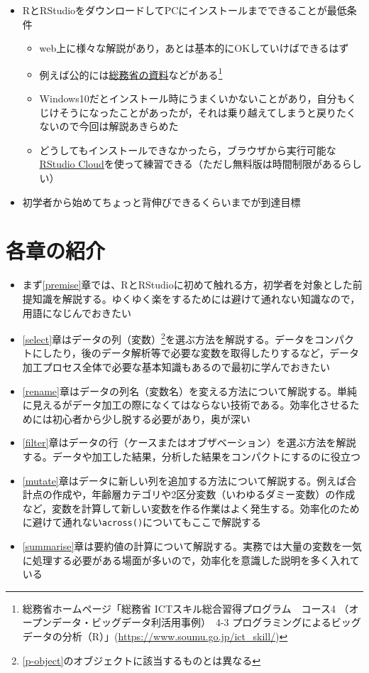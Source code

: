 \documentclass[
  xelatex,ja=standard, b5paper]{bxjsbook}
\providecommand{\tightlist}{%
  \setlength{\itemsep}{0pt}\setlength{\parskip}{0pt}}
\begin{document}
\begin{itemize}
\tightlist
\item
  RとRStudioをダウンロードしてPCにインストールまでできることが最低条件

  \begin{itemize}
  \tightlist
  \item
    web上に様々な解説があり，あとは基本的にOKしていけばできるはず
  \item
    例えば公的には\href{https://www.soumu.go.jp/ict_skill/}{総務省の資料}などがある\footnote{総務省ホームページ「総務省 ICTスキル総合習得プログラム　コース4
      （オープンデータ・ビッグデータ利活用事例）　4-3 プログラミングによるビッグデータの分析（R）」(\url{https://www.soumu.go.jp/ict_skill/})}
  \item
    Windows10だとインストール時にうまくいかないことがあり，自分もくじけそうになったことがあったが，それは乗り越えてしまうと戻りたくないので今回は解説あきらめた
  \item
    どうしてもインストールできなかったら，ブラウザから実行可能な\href{https://rstudio.cloud/}{RStudio Cloud}を使って練習できる（ただし無料版は時間制限があるらしい）
  \end{itemize}
\item
  初学者から始めてちょっと背伸びできるくらいまでが到達目標
\end{itemize}

\hypertarget{ux5404ux7ae0ux306eux7d39ux4ecb}{%
\section*{各章の紹介}\label{ux5404ux7ae0ux306eux7d39ux4ecb}}

\begin{itemize}
\item
  まず\ref{premise}章では、RとRStudioに初めて触れる方，初学者を対象とした前提知識を解説する。ゆくゆく楽をするためには避けて通れない知識なので，用語になじんでおきたい
\item
  \ref{select}章はデータの列（変数）\footnote{\ref{p-object}のオブジェクトに該当するものとは異なる}を選ぶ方法を解説する。データをコンパクトにしたり，後のデータ解析等で必要な変数を取得したりするなど，データ加工プロセス全体で必要な基本知識もあるので最初に学んでおきたい
\item
  \ref{rename}章はデータの列名（変数名）を変える方法について解説する。単純に見えるがデータ加工の際になくてはならない技術である。効率化させるためには初心者から少し脱する必要があり，奥が深い
\item
  \ref{filter}章はデータの行（ケースまたはオブザベーション）を選ぶ方法を解説する。データや加工した結果，分析した結果をコンパクトにするのに役立つ
\item
  \ref{mutate}章はデータに新しい列を追加する方法について解説する。例えば合計点の作成や，年齢層カテゴリや2区分変数（いわゆるダミー変数）の作成など，変数を計算して新しい変数を作る作業はよく発生する。効率化のために避けて通れない\texttt{across()}についてもここで解説する
\item
  \ref{summarise}章は要約値の計算について解説する。実務では大量の変数を一気に処理する必要がある場面が多いので，効率化を意識した説明を多く入れている
\end{itemize}
\end{document}
